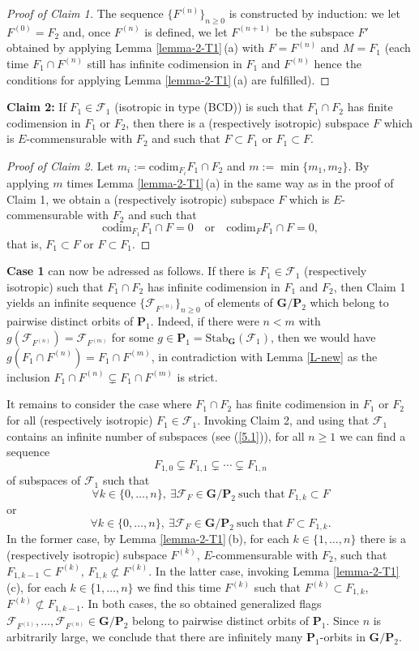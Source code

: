 \documentclass[12pt]{amsart}
\newcommand{\G}{\mathbf{G}}
\renewcommand{\P}{\mathbf{P}}
\newcommand{\Ff}{\mathcal{F}}
\newcommand{\Stab}{\mathrm{Stab}}
\numberwithin{equation}{section}
\theoremstyle{definition}
\begin{document}
\begin{proof}[Proof of Claim 1]
The sequence $\{F^{(n)}\}_{n\geq 0}$ is constructed by induction: we let $F^{(0)}=F_2$ and,
once $F^{(n)}$ is defined, we let $F^{(n+1)}$ be the subspace $F'$ obtained by applying Lemma \ref{lemma-2-T1}\,{\rm (a)} with $F=F^{(n)}$ and $M=F_1$ (each time $F_1\cap F^{(n)}$ still has infinite codimension in $F_1$ and $F^{(n)}$ hence the conditions
for applying Lemma \ref{lemma-2-T1}\,{\rm (a)} are 
fulfilled).
\end{proof}

{\bf Claim 2:} If $F_1\in\Ff_1$ (isotropic in type (BCD)) is such that $F_1\cap F_2$ has finite codimension in $F_1$ or $F_2$,
then there is a (respectively isotropic) subspace $F$ which is $E$-commensurable with $F_2$ and such that 
$F\subset F_1$ or $F_1\subset F$.

\begin{proof}[Proof of Claim 2]
Let $m_i:=\mathrm{codim}_{F_i}F_1\cap F_2$ and $m:=\min\{m_1,m_2\}$. By applying $m$ times Lemma \ref{lemma-2-T1}\,{\rm (a)} in the same way as in the proof of Claim 1, we obtain a (respectively isotropic) subspace $F$ which is $E$-commensurable with $F_2$ and such that
\[\mathrm{codim}_{F_1}F_1\cap F=0\quad\mbox{or}\quad\mathrm{codim}_{F}F_1\cap F=0,\]
that is, $F_1\subset F$ or $F\subset F_1$.
\end{proof}

{\bf Case 1} can now be adressed as follows. If there is $F_1\in\Ff_1$ (respectively isotropic) such that $F_1\cap F_2$ has infinite codimension in $F_1$ and $F_2$, then Claim 1 yields an infinite sequence $\{\Ff_{F^{(n)}}\}_{n\geq 0}$ of elements of $\G/\P_2$ which belong to pairwise distinct orbits of $\P_1$. Indeed, if there were $n<m$ with $g(\Ff_{F^{(n)}})=\Ff_{F^{(m)}}$ for some $g\in\P_1=\Stab_\G(\Ff_1)$, then we would have $g(F_1\cap F^{(n)})=F_1\cap F^{(m)}$, in contradiction with Lemma \ref{L-new} as the inclusion $F_1\cap F^{(n)}\subsetneq F_1\cap F^{(m)}$ is strict.

It remains to consider the case where $F_1\cap F_2$ has finite codimension in $F_1$ or $F_2$ for all (respectively isotropic) $F_1\in\Ff_1$. Invoking Claim 2, and using that $\Ff_1$ contains an infinite number of subspaces (see (\ref{5.1})), for all $n\geq 1$ we can find a sequence
\[
F_{1,0}\subsetneq F_{1,1}\subsetneq\cdots\subsetneq F_{1,n}
\]
of subspaces of $\Ff_1$ such that
\[
\forall k\in\{0,\ldots,n\},\ \exists \Ff_F\in\G/\P_2\ \mbox{such that}\ F_{1,k}\subset F
\]
or
\[
\forall k\in\{0,\ldots,n\},\ \exists \Ff_F\in\G/\P_2\ \mbox{such that}\ F\subset F_{1,k}.
\]
In the former case, by Lemma \ref{lemma-2-T1}\,{\rm (b)}, for each $k\in\{1,\ldots,n\}$ there
is a (respectively isotropic) subspace $F^{(k)}$, $E$-commensurable with $F_2$, such that $F_{1,k-1}\subset F^{(k)}$, $F_{1,k}\not\subset F^{(k)}$.
In the latter case, invoking Lemma \ref{lemma-2-T1}\,{\rm (c)}, for each $k\in\{1,\ldots,n\}$ we find this time $F^{(k)}$ such that $F^{(k)}\subset F_{1,k}$, $F^{(k)}\not\subset F_{1,k-1}$.
In both cases, the so obtained generalized flags $\Ff_{F^{(1)}},\ldots,\Ff_{F^{(n)}}\in \G/\P_2$ belong to pairwise distinct orbits of $\P_1$. Since $n$ is arbitrarily large, we conclude that there are infinitely many $\P_1$-orbits in $\G/\P_2$.
\end{document}
